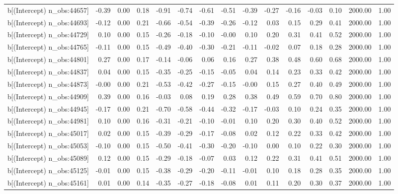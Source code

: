 \begin{table}[ht]
\begin{tabular}{rrrrrrrrrrrrrrr}
  b[(Intercept) n\_obs:44657] & -0.39 & 0.00 & 0.18 & -0.91 & -0.74 & -0.61 & -0.51 & -0.39 & -0.27 & -0.16 & -0.03 & 0.10 & 2000.00 & 1.00 \\ 
  b[(Intercept) n\_obs:44693] & -0.12 & 0.00 & 0.21 & -0.66 & -0.54 & -0.39 & -0.26 & -0.12 & 0.03 & 0.15 & 0.29 & 0.41 & 2000.00 & 1.00 \\ 
  b[(Intercept) n\_obs:44729] & 0.10 & 0.00 & 0.15 & -0.26 & -0.18 & -0.10 & -0.00 & 0.10 & 0.20 & 0.31 & 0.41 & 0.52 & 2000.00 & 1.00 \\ 
  b[(Intercept) n\_obs:44765] & -0.11 & 0.00 & 0.15 & -0.49 & -0.40 & -0.30 & -0.21 & -0.11 & -0.02 & 0.07 & 0.18 & 0.28 & 2000.00 & 1.00 \\ 
  b[(Intercept) n\_obs:44801] & 0.27 & 0.00 & 0.17 & -0.14 & -0.06 & 0.06 & 0.16 & 0.27 & 0.38 & 0.48 & 0.60 & 0.68 & 2000.00 & 1.00 \\ 
  b[(Intercept) n\_obs:44837] & 0.04 & 0.00 & 0.15 & -0.35 & -0.25 & -0.15 & -0.05 & 0.04 & 0.14 & 0.23 & 0.33 & 0.42 & 2000.00 & 1.00 \\ 
  b[(Intercept) n\_obs:44873] & -0.00 & 0.00 & 0.21 & -0.53 & -0.42 & -0.27 & -0.15 & -0.00 & 0.15 & 0.27 & 0.40 & 0.49 & 2000.00 & 1.00 \\ 
  b[(Intercept) n\_obs:44909] & 0.39 & 0.00 & 0.16 & -0.03 & 0.08 & 0.19 & 0.28 & 0.38 & 0.49 & 0.59 & 0.70 & 0.80 & 2000.00 & 1.00 \\ 
  b[(Intercept) n\_obs:44945] & -0.17 & 0.00 & 0.21 & -0.70 & -0.58 & -0.44 & -0.32 & -0.17 & -0.03 & 0.10 & 0.24 & 0.35 & 2000.00 & 1.00 \\ 
  b[(Intercept) n\_obs:44981] & 0.10 & 0.00 & 0.16 & -0.31 & -0.21 & -0.10 & -0.01 & 0.10 & 0.20 & 0.30 & 0.40 & 0.52 & 2000.00 & 1.00 \\ 
  b[(Intercept) n\_obs:45017] & 0.02 & 0.00 & 0.15 & -0.39 & -0.29 & -0.17 & -0.08 & 0.02 & 0.12 & 0.22 & 0.33 & 0.42 & 2000.00 & 1.00 \\ 
  b[(Intercept) n\_obs:45053] & -0.10 & 0.00 & 0.15 & -0.50 & -0.41 & -0.30 & -0.20 & -0.10 & 0.00 & 0.10 & 0.22 & 0.30 & 2000.00 & 1.00 \\ 
  b[(Intercept) n\_obs:45089] & 0.12 & 0.00 & 0.15 & -0.29 & -0.18 & -0.07 & 0.03 & 0.12 & 0.22 & 0.31 & 0.41 & 0.51 & 2000.00 & 1.00 \\ 
  b[(Intercept) n\_obs:45125] & -0.01 & 0.00 & 0.15 & -0.38 & -0.29 & -0.20 & -0.11 & -0.01 & 0.10 & 0.18 & 0.28 & 0.35 & 2000.00 & 1.00 \\ 
  b[(Intercept) n\_obs:45161] & 0.01 & 0.00 & 0.14 & -0.35 & -0.27 & -0.18 & -0.08 & 0.01 & 0.11 & 0.20 & 0.30 & 0.37 & 2000.00 & 1.00 \\ 

\end{tabular}
\end{table}
